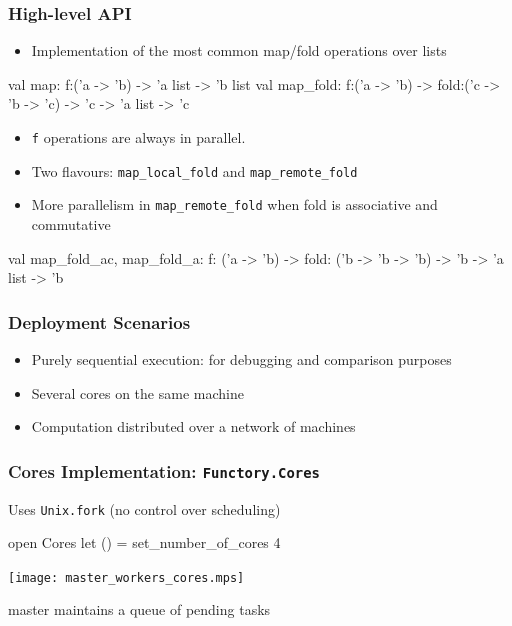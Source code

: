 \documentclass[xcolor=dvipsnames,8pt]{beamer}
\begin{document}

\begin{frame}\frametitle {High-level API}
  \begin{itemize}
  \item Implementation of the most common map/fold operations over lists
  \end{itemize}
  \begin{ocaml}
val map: f:('a -> 'b) -> 'a list -> 'b list
val map_fold: f:('a -> 'b) -> 
                fold:('c -> 'b -> 'c) -> 'c -> 'a list -> 'c
  \end{ocaml}
  \begin{itemize}
  \item \texttt{f} operations are always in parallel.
  \item Two flavours: \texttt{map\_local\_fold} and
    \texttt{map\_remote\_fold}
  \item More parallelism in \texttt{map\_remote\_fold} when fold is
    associative and commutative
  \end{itemize}
  \begin{ocaml}
val map_fold_ac, map_fold_a:
f: ('a -> 'b) -> 
fold: ('b -> 'b -> 'b) -> 'b -> 'a list -> 'b
  \end{ocaml}
\end{frame}


\begin{frame}\frametitle {Deployment Scenarios}
  \begin{itemize}
  \item Purely sequential execution: for debugging and comparison
    purposes
  \item Several cores on the same machine
  \item Computation distributed over a network of machines
  \end{itemize}
  
\end{frame}


\begin{frame}\frametitle {Cores Implementation: \texttt{Functory.Cores}}
  Uses \texttt{Unix.fork} (no control over scheduling)

  \begin{ocaml}
  open Cores
  let () = set_number_of_cores 4
  \end{ocaml}

  \begin{center}
    \texttt{[image: master\_workers\_cores.mps]}
  \end{center}

  master maintains a queue of pending tasks
  
\end{frame}
\end{document}
